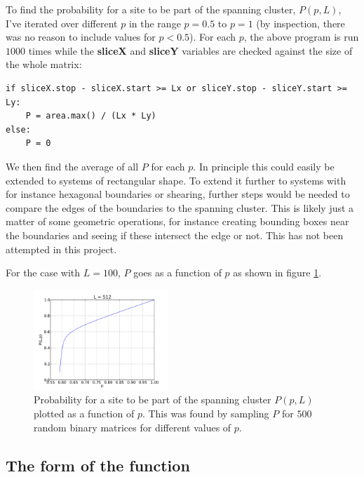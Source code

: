 \documentclass[a4paper,reprint,floatfix,amsmath,amssymb,aps,pra]{revtex4-1}
\begin{document}
To find the probability for a site to be part of the spanning cluster, $P(p,L)$, I've iterated over different $p$ in the range $p=0.5$ to $p=1$ (by inspection, there was no reason to include values for $p<0.5$). For each $p$, the above program is run $1000$ times while the \textbf{sliceX} and \textbf{sliceY} variables are checked against the size of the whole matrix:
\begin{lstlisting}
if sliceX.stop - sliceX.start >= Lx or sliceY.stop - sliceY.start >= Ly:
    P = area.max() / (Lx * Ly)
else:
    P = 0
\end{lstlisting}
We then find the average of all $P$ for each $p$. In principle this could easily be extended to systems of rectangular shape. To extend it further to systems with for instance hexagonal boundaries or shearing, further steps would be needed to compare the edges of the boundaries to the spanning cluster. This is likely just a matter of some geometric operations, for instance creating bounding boxes near the boundaries and seeing if these intersect the edge or not. This has not been attempted in this project.

For the case with $L=100$, $P$ goes as a function of $p$ as shown in figure \ref{fig:P-vs-p}.
\begin{figure}
  \centering
  \includegraphics[width=0.45\textwidth]{../percolation/results/1a/P-vs-p-L512-nsamples500.pdf}
  \caption{Probability for a site to be part of the spanning cluster $P(p,L)$ plotted as a function of $p$. This was found by sampling $P$ for $500$ random binary matrices for different values of $p$.}
  \label{fig:P-vs-p}
\end{figure}

\subsection{The form of the function}
\end{document}

